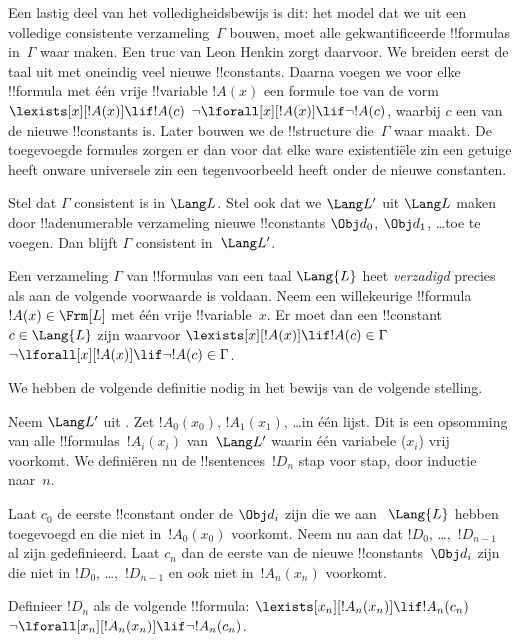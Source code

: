 \documentclass[../../../include/open-logic-section]{subfiles}
\begin{document}


\begin{explain}
Een lastig deel van het volledigheidsbewijs is dit: het model dat we uit
een volledige consistente verzameling~$\Gamma$ bouwen, moet alle
gekwantificeerde !!{formula}s in~$\Gamma$ waar maken. Een truc van Leon
Henkin zorgt daarvoor. We breiden eerst de taal uit met oneindig veel
nieuwe !!{constant}s. Daarna voegen we voor elke !!{formula} met één
vrije !!{variable} $!A(x)$ een formule toe van de vorm
      {$\lexists[x][!A(x)] \lif !A(c)$}
      {$\lnot\lforall[x][!A(x)] \lif \lnot !A(c)$},
waarbij $c$ een van de nieuwe !!{constant}s is. Later bouwen we de
!!{structure} die~$\Gamma$ waar maakt. De toegevoegde formules zorgen er
dan voor dat elke
{ware existentiële zin een getuige heeft}
{onware universele zin een tegenvoorbeeld heeft}
onder de nieuwe constanten.
\end{explain}

\begin{prop}
Stel dat $\Gamma$ consistent is in $\Lang L$. Stel ook dat we $\Lang L'$
uit $\Lang L$ maken door !!a{denumerable} verzameling nieuwe
!!{constant}s $\Obj d_0$, $\Obj d_1$, \dots toe te voegen. Dan blijft
$\Gamma$ consistent in~$\Lang L'$.
\end{prop}

\begin{defn}
Een verzameling $\Gamma$ van !!{formula}s van een taal $\Lang {L}$ heet
\emph{verzadigd} precies als aan de volgende voorwaarde is voldaan. Neem
een willekeurige !!{formula}~$!A(x) \in \Frm[L]$ met één vrije
!!{variable}~$x$. Er moet dan een !!{constant}~$c \in \Lang{L}$ zijn
waarvoor
      {$\lexists[x][!A(x)] \lif !A(c) \in \Gamma$}
      {$\lnot\lforall[x][!A(x)] \lif \lnot !A(c) \in \Gamma$}.
\end{defn}

We hebben de volgende definitie nodig in het bewijs van de volgende
stelling.

\begin{defn}
Neem $\Lang L'$ uit . Zet $!A_0(x_0)$,
$!A_1(x_1)$, \dots in één lijst. Dit is een opsomming van alle
!!{formula}s~$!A_i(x_i)$ van~$\Lang L'$ waarin één variabele ($x_i$)
vrij voorkomt. We definiëren nu de !!{sentence}s~$!D_n$ stap voor stap,
door inductie naar~$n$.

Laat $c_0$ de eerste !!{constant} onder de $\Obj d_i$ zijn die we aan
~$\Lang{L}$ hebben toegevoegd en die niet in~$!A_0(x_0)$ voorkomt. Neem
nu aan dat $!D_0$, \dots,~$!D_{n-1}$ al zijn gedefinieerd. Laat $c_n$
dan de eerste van de nieuwe !!{constant}s~$\Obj d_i$ zijn die niet in
$!D_0$, \dots,~$!D_{n-1}$ en ook niet in~$!A_n(x_n)$ voorkomt.

Definieer $!D_{n}$ als de volgende !!{formula}: 
{$\lexists[x_{n}][!A_{n}(x_{n})] \lif
  !A_{n}(c_{n})$}{$\lnot\lforall[x_{n}][!A_{n}(x_{n})] \lif \lnot
  !A_{n}(c_{n})$}.
\end{defn}
\end{document}
